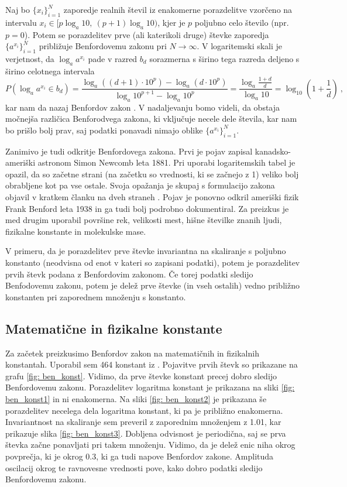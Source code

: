 \documentclass[11pt, oneside]{article}
\theoremstyle{definition}
\begin{document}
Naj bo $\{ x_i\}_{i=1}^N$ zaporedje realnih števil iz enakomerne porazdelitve vzorčeno na intervalu
$x_i\in [p \log_a 10,\> (p+1) \log_a 10)$, kjer je $p$ poljubno celo število (npr. $p=0$).
Potem se porazdelitev prve (ali katerikoli druge) števke zaporedja $\{ a^{x_i} \}_{i=1}^N$ približuje
Benfordovemu zakonu pri $N \rightarrow \infty$. V logaritemski skali je verjetnost, da $\log_a a^{x_i}$ pade v
razred $b_d$ sorazmerna s širino tega razreda deljeno s širino celotnega intervala
\begin{equation}
    P(\log_a a^{x_i} \in b_d) = \frac{\log_a \left ( (d+1) \cdot 10^p \right ) - \log_a \left ( d \cdot 10^p \right ) }{\log_a 10^{p+1} - \log_a 10^p} = \frac{\log_a \frac{1+d}{d}}{\log_a 10} = \log_{10} \left ( 1 + \frac{1}{d} \right ) \>,
\end{equation}
kar nam da nazaj Benfordov zakon \cite{romerorochin2009derivation}.
V nadaljevanju bomo videli, da obstaja močnejša različica Benforodvega zakona, ki vključuje necele dele
števila, kar nam bo prišlo bolj prav, saj podatki ponavadi nimajo oblike $\{ a^{x_i} \}_{i=1}^N$.

Zanimivo je tudi odkritje Benfordovega zakona. Prvi je pojav zapisal kanadsko-ameriški astronom Simon Newcomb
leta 1881. Pri uporabi logaritemskih tabel je opazil, da so začetne strani (na začetku so vrednosti, ki se začnejo z 1)
veliko bolj obrabljene kot pa vse ostale. Svoja opažanja je skupaj s formulacijo zakona objavil v
kratkem članku na dveh straneh \cite{newcomb}. Pojav je ponovno odkril ameriški fizik Frank Benford leta 1938 in ga tudi bolj
podrobno dokumentiral. Za preizkus je med drugim uporabil površine rek, velikosti mest, hišne številke znanih ljudi,
fizikalne konstante in molekulske mase.

V primeru, da je porazdelitev prve števke invariantna na skaliranje s poljubno konstanto (neodvisna od enot v kateri
so zapisani podatki), potem je porazdelitev prvih števk podana z Benfordovim zakonom.
Če torej podatki sledijo Benfodovemu zakonu, potem je delež prve števke (in vseh ostalih) vedno približno konstanten pri zaporednem
množenju s konstanto.

\subsection{Matematične in fizikalne konstante}
Za začetek preizkusimo Benfordov zakon na matematičnih in fizikalnih konstantah.
Uporabil sem 464 konstant iz \cite{scipy_const}. Pojavitve prvih števk so prikazane na grafu \ref{fig: ben_konst}.
Vidimo, da prve števke konstant precej dobro sledijo Benfordovemu zakonu.
Porazdelitev logaritma konstant je prikazana na sliki \ref{fig: ben_konst1} in ni enakomerna.
Na sliki \ref{fig: ben_konst2} je prikazana še porazdelitev necelega dela logaritma konstant, ki pa je
približno enakomerna. Invariantnost na skaliranje sem preveril z zaporednim množenjem z 1.01, kar
prikazuje slika \ref{fig: ben_konst3}. Dobljena odvisnost je periodična, saj se prva števka začne ponavljati
pri takem množenju. Vidimo, da je delež enic niha okrog povprečja, ki je okrog 0.3, ki ga tudi napove
Benfordov zakone. Amplituda oscilacij okrog te ravnovesne vrednosti pove, kako dobro podatki sledijo
Benfordovemu zakonu.
\end{document}
